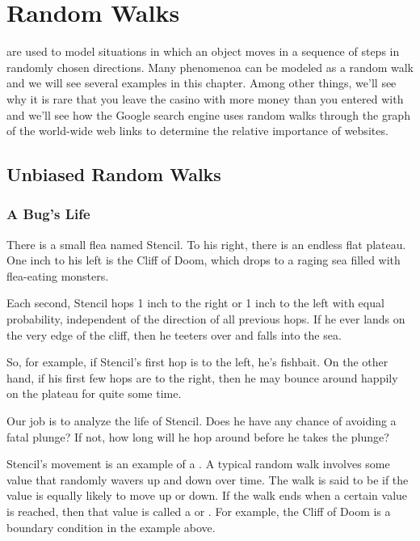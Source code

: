 \chapter{Random Walks}\label{ran_process_chap}

 are used to model situations in which an object
moves in a sequence of steps in randomly chosen directions.  Many
phenomenoa can be modeled as a random walk and we will see several
examples in this chapter.  Among other things, we'll see why it is
rare that you leave the casino with more money than you entered with
and we'll see how the Google search engine uses random walks through
the graph of the world-wide web links to determine the relative
importance of websites.

\section{Unbiased Random Walks}

\subsection{A Bug's Life}

There is a small flea named Stencil.  To his right, there is an
endless flat plateau.  One inch to his left is the Cliff of Doom,
which drops to a raging sea filled with flea-eating monsters.
%
\begin{figure}[h]
\end{figure}

Each second, Stencil hops 1 inch to the right or 1 inch to the left
with equal probability, independent of the direction of all previous
hops.  If he ever lands on the very edge of the cliff, then he teeters
over and falls into the sea.
%
\begin{figure}[h]
\end{figure}
%
So, for example, if Stencil's first hop is to the left, he's fishbait.
On the other hand, if his first few hops are to the right, then he may
bounce around happily on the plateau for quite some time.

Our job is to analyze the life of Stencil.  Does he have any chance of
avoiding a fatal plunge?  If not, how long will he hop around before
he takes the plunge?

Stencil's movement is an example of a .  A typical
 random walk involves some value that randomly
wavers up and down over time.  The walk is said to be 
if the value is equally likely to move up or down.  If the walk ends
when a certain value is reached, then that value is called a
 or .  For example,
the Cliff of Doom is a boundary condition in the example above.

